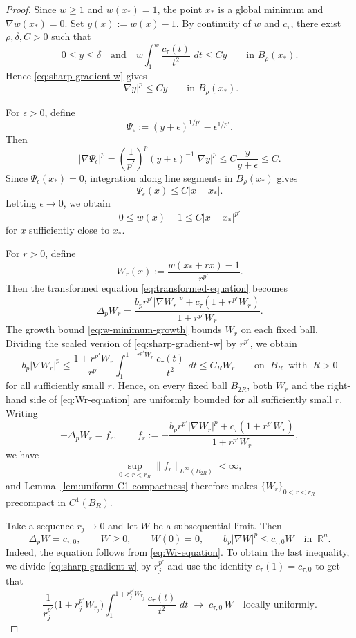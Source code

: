 \documentclass[reqno,12pt]{amsart}
\numberwithin{equation}{section}
\theoremstyle{remark}
\newcommand{\R}{\mathbb R}
\newcommand{\dd}{\,d}
\begin{document}
\begin{proof}
Since $w\ge1$ and $w(x_*)=1$, the point $x_*$ is a
global minimum and $\nabla w(x_*)=0$.
Set $y(x):=w(x)-1.$
By continuity of $w$ and $c_\tau$, there exist $\rho,\delta,C>0$ such that
$$
0\le y\le\delta \quad\text{and}\quad
w\int_1^w\frac{c_\tau(t)}{t^2}\,\dd t \le Cy
\qquad\text{in }B_\rho(x_*).
$$
Hence \eqref{eq:sharp-gradient-w} gives
$$
|\nabla y|^p\le Cy \qquad\text{in }B_\rho(x_*).
$$

For $\epsilon>0$, define
$$
\Psi_\epsilon := (y+\epsilon)^{1/p'} -\epsilon^{1/p'}.
$$
Then
$$
|\nabla\Psi_\epsilon|^p
=\left(\frac1{p'}\right)^p (y+\epsilon)^{-1}|\nabla y|^p \le C\frac{y}{y+\epsilon} \le C.
$$
Since $\Psi_\epsilon(x_*)=0$, integration along line
segments in $B_\rho(x_*)$ gives
$$
\Psi_\epsilon(x)\le C|x-x_*|.
$$
Letting $\epsilon\to 0$, we obtain
\begin{equation}\label{eq:w-minimum-growth}
    0\le w(x)-1\le C|x-x_*|^{p'}
\end{equation}
for $x$ sufficiently close to $x_*$.

For $r>0$, define
$$
W_r(x):=\frac{w(x_*+rx)-1}{r^{p'}}.
$$
Then the transformed equation \eqref{eq:transformed-equation} becomes
\begin{equation}\label{eq:Wr-equation}
 \Delta_pW_r  =\frac{b_pr^{p'}|\nabla W_r|^p
+c_\tau(1+r^{p'}W_r)}{1+r^{p'}W_r}.
\end{equation}
The growth bound \eqref{eq:w-minimum-growth} bounds $W_r$ on each fixed ball.  Dividing  the scaled version of \eqref{eq:sharp-gradient-w} by $r^{p'}$, we obtain
\begin{equation}\label{eq:W-upper}
b_p  |\nabla W_r|^p \le \frac{1+r^{p'}W_r}{r^{p'}}\int_1^{1+r^{p'}W_r}\frac{c_\tau(t)}{t^2}\, \dd t \le C_R W_r     \qquad\text{on }\  B_R \ \text{ with }\  R>0
\end{equation}
for all sufficiently small $r$.
Hence, on every fixed ball $B_{2R}$, both $W_r$ and the right-hand side of \eqref{eq:Wr-equation} are uniformly bounded for all sufficiently small $r$.  Writing
$$
-\Delta_pW_r=f_r,
\qquad f_r:=-\frac{b_pr^{p'}|\nabla W_r|^p
+c_\tau(1+r^{p'}W_r)}{1+r^{p'}W_r},
$$
we have
$$
\sup_{0<r<r_R}\|f_r\|_{L^\infty(B_{2R})}<\infty,
$$
and Lemma~\ref{lem:uniform-C1-compactness} therefore makes
$\{W_r\}_{0<r<r_R}$ precompact in $C^1(B_R)$.

Take a sequence $r_j\to 0$ and let $W$ be a subsequential limit.  Then
\begin{equation}\label{eq:tangent-limit-system}
 \Delta_p W=c_{\tau,0},
 \qquad  W\ge0,  \qquad  W(0)=0,
 \qquad  b_p|\nabla W|^p\le c_{\tau,0}W  \quad \text{in } \ \R^n.
\end{equation}
Indeed, the equation follows from \eqref{eq:Wr-equation}. To obtain the last inequality, we divide \eqref{eq:sharp-gradient-w} by $r_j^{p'}$ and use the identity $c_\tau(1)=c_{\tau,0}$ to get that
$$
 \frac{1}{r_j^{p'}}\bigl(1 + r_j^{p'} W_{r_j}\bigr)
 \int_1^{1 + r_j^{p'} W_{r_j}} \frac{c_\tau(t)}{t^2}\,\dd t  \;\to\;  c_{\tau,0}\,W  \quad \text{locally uniformly.}
$$


\end{proof}
\end{document}
